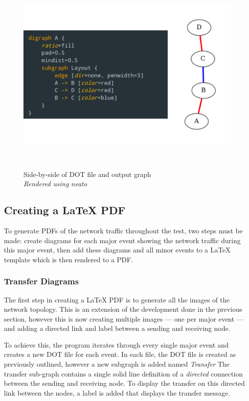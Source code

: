 \begin{figure}
    \begin{centering}
        \includegraphics[width=15cm,height=10cm,keepaspectratio]{Figures/Chapter5-DotAndRender.png}
        \caption{Side-by-side of DOT file and output graph\\\emph{Rendered using neato}}
        \label{fig:chapter5DotAndRender}
    \end{centering}
\end{figure}

\subsection{Creating a LaTeX PDF}
To generate PDFs of the network traffic throughout the test, two steps must be made: create diagrams for each major event showing the network traffic during this major event, then add these diagrams and all minor events to a LaTeX template which is then rendered to a PDF.

\subsubsection{Transfer Diagrams}
The first step in creating a LaTeX PDF is to generate all the images of the network topology.
This is an extension of the development done in the previous section, however this is now creating multiple images — one per major event — and adding a directed link and label between a sending and receiving node.

To achieve this, the program iterates through every single major event and creates a new DOT file for each event.
In each file, the DOT file is created as previously outlined, however a new subgraph is added named \emph{Transfer}
The transfer sub-graph contains a single solid line definition of a \emph{directed} connection between the sending and receiving node.
To display the transfer on this directed link between the nodes, a label is added that displays the transfer message.

